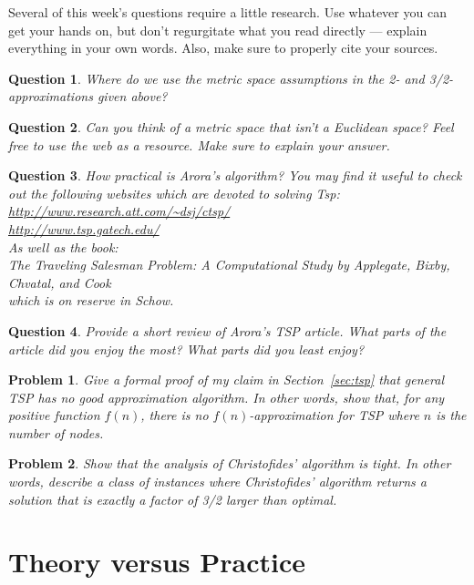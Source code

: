 \documentclass[11pt]{article}
\newtheorem{question}{Question}
\newtheorem{problem}{Problem}
\newcommand{\TSP}{{\sc Tsp}\xspace}
\begin{document}
Several of this week's questions require a little research.  Use whatever you can get your hands on, but don't regurgitate what you read directly --- explain everything in your own words.  Also, make sure to properly cite your sources. 

\begin{question}
Where do we use the metric space assumptions in the 2- and 3/2-approximations given above?
\end{question}

\begin{question}
Can you think of a metric space that isn't a Euclidean space?  Feel free to use the web as a resource.  Make sure to explain your answer.
\end{question}

\begin{question}
How practical is Arora's algorithm?  You may find it useful to check out the following websites which are devoted to solving \TSP:\\
\url{http://www.research.att.com/~dsj/ctsp/}\\
\url{http://www.tsp.gatech.edu/}\\
As well as the book:\\
{\em The Traveling Salesman Problem: A Computational Study by Applegate, Bixby, Chvatal, and Cook} \\
which is on reserve in Schow.
\end{question}

\begin{question}
Provide a short review of Arora's TSP article.  What parts of the article did you enjoy the most?  What parts did you least enjoy?  
\end{question}

\begin{problem}
Give a formal proof of my claim in Section~\ref{sec:tsp} that general TSP has no good approximation algorithm.  In other words, show that, for any positive function $f(n)$, there is no $f(n)$-approximation for TSP where $n$ is the number of nodes.
\end{problem}

\begin{problem}
Show that the analysis of Christofides' algorithm is tight.  In other words, describe a class of instances where Christofides' algorithm returns a solution that is exactly a factor of 3/2 larger than optimal.
\end{problem}

\section{Theory versus Practice}
\end{document}
